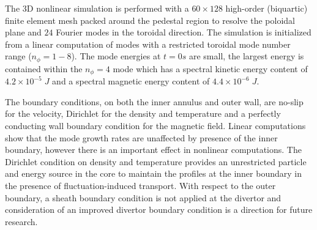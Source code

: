 
The 3D nonlinear simulation is performed with a $60\times128$ high-order
(biquartic) finite element mesh packed around the pedestal region to resolve
the poloidal plane and $24$ Fourier modes in the toroidal direction. The
simulation is initialized from a linear computation of modes with a restricted
toroidal mode number range ($n_\phi=1-8$). The mode energies at $t=0s$ are
small, the largest energy is contained within the $n_\phi=4$ mode which has a
spectral kinetic energy content of $4.2\times10^{-5}\;J$ and a spectral
magnetic energy content of $4.4\times10^{-6}\;J$.

The boundary conditions, on both the inner annulus and outer wall, are no-slip
for the velocity, Dirichlet for the density and temperature and a perfectly
conducting wall boundary condition for the magnetic field.  Linear computations
show that the mode growth rates are unaffected by presence of the inner
boundary, however there is an important effect in nonlinear computations.  The
Dirichlet condition on density and temperature provides an unrestricted
particle and energy source in the core to maintain the profiles at the inner
boundary in the presence of fluctuation-induced transport. With respect to the
outer boundary, a sheath boundary condition is not applied at the divertor and
consideration of an improved divertor boundary condition is a direction for future
research.


